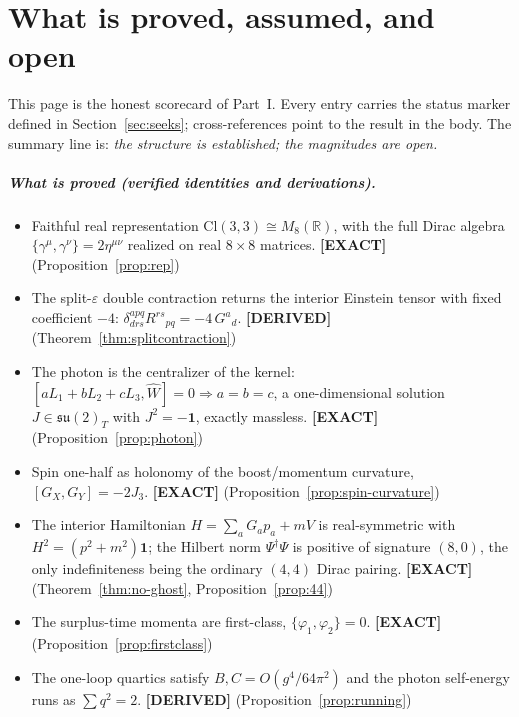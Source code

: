 \documentclass[11pt,oneside]{book}
\newcommand{\Wh}{\hat{W}}                         %
\newcommand{\Cl}{\mathrm{Cl}}                     %
\newcommand{\RR}{\mathbb{R}}
\newcommand{\su}{\mathfrak{su}}
\newcommand{\status}[1]{{\sffamily\bfseries\color{statuscol}[#1]}}
\theoremstyle{plain}
\theoremstyle{definition}
\theoremstyle{remark}
\begin{document}
\chapter*{What is proved, assumed, and open}
\vspace*{-1.2cm}

This page is the honest scorecard of Part~I. Every entry carries the status marker
defined in Section~\ref{sec:seeks}; cross-references point to the result in the
body. The summary line is: \emph{the structure is established; the magnitudes are
open.}

{\footnotesize
\paragraph{What is proved (verified identities and derivations).}
\begin{itemize}\setlength{\itemsep}{1pt}\setlength{\parskip}{0pt}
\item Faithful real representation $\Cl(3,3)\cong M_8(\RR)$, with the full Dirac
  algebra $\{\gamma^\mu,\gamma^\nu\}=2\eta^{\mu\nu}$ realized on real
  $8\times8$ matrices. \status{EXACT} (Proposition~\ref{prop:rep})
\item The split-$\varepsilon$ double contraction returns the interior Einstein
  tensor with fixed coefficient $-4$:
  $\delta^{apq}_{drs}R^{rs}{}_{pq}=-4\,G^a{}_d$. \status{DERIVED}
  (Theorem~\ref{thm:splitcontraction})
\item The photon is the centralizer of the kernel:
  $[aL_1+bL_2+cL_3,\Wh]=0\Rightarrow a{=}b{=}c$, a one-dimensional solution
  $J\in\su(2)_T$ with $J^2=-\mathbf 1$, exactly massless.
  \status{EXACT} (Proposition~\ref{prop:photon})
\item Spin one-half as holonomy of the boost/momentum curvature,
  $[G_X,G_Y]=-2J_3$. \status{EXACT} (Proposition~\ref{prop:spin-curvature})
\item The interior Hamiltonian $H=\sum_a G_a p_a+mV$ is real-symmetric with
  $H^2=(p^2+m^2)\mathbf 1$; the Hilbert norm $\Psi^\dagger\Psi$ is positive of
  signature $(8,0)$, the only indefiniteness being the ordinary $(4,4)$ Dirac
  pairing. \status{EXACT} (Theorem~\ref{thm:no-ghost}, Proposition~\ref{prop:44})
\item The surplus-time momenta are first-class, $\{\varphi_1,\varphi_2\}=0$.
  \status{EXACT} (Proposition~\ref{prop:firstclass})
\item The one-loop quartics satisfy $B,C=O(g^4/64\pi^2)$ and the photon
  self-energy runs as $\sum q^2=2$. \status{DERIVED} (Proposition~\ref{prop:running})
\end{itemize}

}
\end{document}
